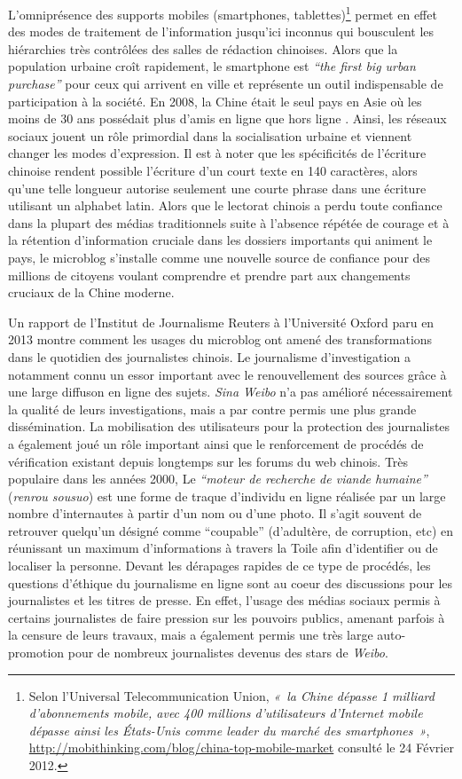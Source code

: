 L’omniprésence des supports mobiles (smartphones, tablettes)\footnote{Selon l’Universal Telecommunication Union, \textit{« la Chine dépasse 1 milliard d’abonnements mobile, avec 400 millions d’utilisateurs d’Internet mobile dépasse ainsi les États-Unis comme leader du marché des smartphones »}, \url{http://mobithinking.com/blog/china-top-mobile-market} consulté le 24 Février 2012.} permet en effet des modes de traitement de l’information jusqu’ici inconnus qui bousculent les hiérarchies très contrôlées des salles de rédaction chinoises. Alors que la population urbaine croît rapidement, le smartphone est \textit{“the first big urban purchase”} \citep{Wallis2013} pour ceux qui arrivent en ville et représente un outil indispensable de participation à la société. En 2008, la Chine était le seul pays en Asie où les moins de 30 ans possédait plus d’amis en ligne que hors ligne \citep{Hinckley2009}. Ainsi, les réseaux sociaux jouent un rôle primordial dans la socialisation urbaine et viennent changer les modes d’expression. Il est à noter que les spécificités de l’écriture chinoise rendent possible l’écriture d’un court texte en 140 caractères, alors qu’une telle longueur autorise seulement une courte phrase dans une écriture utilisant un alphabet latin. Alors que le lectorat chinois a perdu toute confiance dans la plupart des médias traditionnels suite à l’absence répétée de courage et à la rétention d’information cruciale dans les dossiers importants qui animent le pays, le microblog s’installe comme une nouvelle source de confiance pour des millions de citoyens voulant comprendre et prendre part aux changements cruciaux de la Chine moderne.

Un rapport de l’Institut de Journalisme Reuters à l’Université Oxford paru en 2013 montre comment les usages du microblog ont amené des transformations dans le quotidien des journalistes chinois. Le journalisme d’investigation a notamment connu un essor important avec le renouvellement des sources grâce à une large diffuson en ligne des sujets. \textit{Sina Weibo} n’a pas amélioré nécessairement la qualité de leurs investigations, mais a par contre permis une plus grande dissémination. La mobilisation des utilisateurs pour la protection des journalistes a également joué un rôle important ainsi que le renforcement de procédés de vérification existant depuis longtemps sur les forums du web chinois. Très populaire dans les années 2000, Le \textit{“moteur de recherche de viande humaine”} (\textit{renrou sousuo}) est une forme de traque d’individu en ligne réalisée par un large nombre d’internautes à partir d’un nom ou d’une photo. Il s’agit souvent de retrouver quelqu’un désigné comme “coupable” (d’adultère, de corruption, etc) en réunissant un maximum d’informations à travers la Toile afin d’identifier ou de localiser la personne. Devant les dérapages rapides de ce type de procédés, les questions d’éthique du journalisme en ligne sont au coeur des discussions pour les journalistes et les titres de presse. En effet, l’usage des médias sociaux permis à certains journalistes de faire pression sur les pouvoirs publics, amenant parfois à la censure de leurs travaux, mais a également permis une très large auto-promotion pour de nombreux journalistes devenus des stars de \textit{Weibo}.

